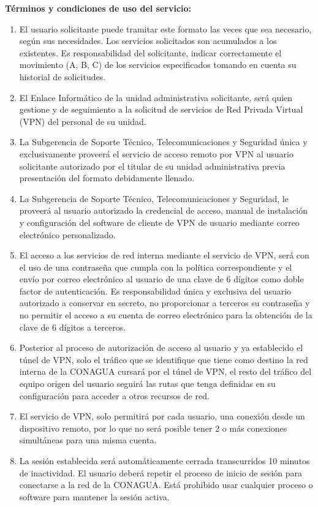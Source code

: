 \documentclass[letterpaper,11pt]{article}
\begin{document}
\textbf{ Términos y condiciones de uso del servicio:}
{ \small \begin{enumerate}
	\item El usuario solicitante puede tramitar este formato las veces que sea necesario, según sus necesidades. Los servicios solicitados son acumulados a los existentes. Es responsabilidad del solicitante, indicar correctamente el movimiento (A, B, C) de los servicios especificados tomando en cuenta su historial de solicitudes.
	\item El Enlace Informático de la unidad administrativa solicitante, será quien gestione y de seguimiento a la solicitud de servicios de Red Privada Virtual (VPN) del personal de su unidad. 
	\item La Subgerencia de Soporte Técnico, Telecomunicaciones y Seguridad única y exclusivamente proveerá el servicio de acceso remoto por VPN al usuario solicitante autorizado por el titular de su unidad administrativa previa presentación del formato debidamente llenado.
	\item La Subgerencia de Soporte Técnico, Telecomunicaciones y Seguridad, le proveerá al usuario autorizado la credencial de acceso, manual de instalación y configuración del software de cliente de VPN de usuario mediante correo electrónico personalizado.
	\item El acceso a los servicios de red interna mediante el servicio de VPN, será con el uso de una contraseña que cumpla con la política correspondiente y el envío por correo electrónico al usuario de una clave de 6 dígitos como doble factor de autenticación. Es responsabilidad única y exclusiva del usuario autorizado a conservar en secreto, no proporcionar a terceros su contraseña y no permitir el acceso a su cuenta de correo electrónico para la obtención de la clave de 6 dígitos a terceros.
	\item Posterior al proceso de autorización de acceso al usuario y ya establecido el túnel de VPN, solo el tráfico que se identifique que tiene como destino la red interna de la CONAGUA cursará por el túnel de VPN, el resto del tráfico del equipo origen del usuario seguirá las rutas que tenga definidas en su configuración para acceder a otros recursos de red.
	\item El servicio de VPN, solo permitirá por cada usuario, una conexión desde un dispositivo remoto, por lo que no será posible tener 2 o más conexiones simultáneas para una misma cuenta.
	\item La sesión establecida será automáticamente cerrada transcurridos 10 minutos de inactividad. El usuario deberá repetir el proceso de inicio de sesión para conectarse a la red de la CONAGUA. Está prohibido usar cualquier proceso o software para mantener la sesión activa.

\end{enumerate}}
\end{document}
